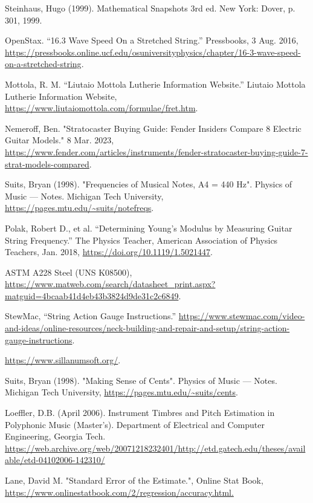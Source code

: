 \begin{thebibliography}{15}
    \scriptsize
     Steinhaus, Hugo (1999). Mathematical Snapshots 3rd ed. New York: Dover, p. 301, 1999.
    
     OpenStax. “16.3 Wave Speed On a Stretched String.” Pressbooks, 3 Aug. 2016, \url{https://pressbooks.online.ucf.edu/osuniversityphysics/chapter/16-3-wave-speed-on-a-stretched-string}.

     Mottola, R. M. “Liutaio Mottola Lutherie Information Website.” Liutaio Mottola Lutherie Information Website, \url{https://www.liutaiomottola.com/formulae/fret.htm}.

     Nemeroff, Ben. "Stratocaster Buying Guide: Fender Insiders Compare 8 Electric Guitar Models." 8 Mar. 2023, \url{https://www.fender.com/articles/instruments/fender-stratocaster-buying-guide-7-strat-models-compared}.

     Suits, Bryan (1998). "Frequencies of Musical Notes, A4 = 440 Hz". Physics of Music — Notes. Michigan Tech University, \url{https://pages.mtu.edu/~suits/notefreqs}.
    
     Polak, Robert D., et al. “Determining Young’s Modulus by Measuring Guitar String Frequency.” The Physics Teacher, American Association of Physics Teachers, Jan. 2018, \url{https://doi.org/10.1119/1.5021447}.

     ASTM A228 Steel (UNS K08500), \url{https://www.matweb.com/search/datasheet_print.aspx?matguid=4bcaab41d4eb43b3824d9de31c2c6849}.

     StewMac, “String Action Gauge Instructions.” \url{https://www.stewmac.com/video-and-ideas/online-resources/neck-building-and-repair-and-setup/string-action-gauge-instructions}.

     \url{https://www.sillanumsoft.org/}.

     Suits, Bryan (1998). "Making Sense of Cents". Physics of Music — Notes. Michigan Tech University, \url{https://pages.mtu.edu/~suits/cents}.

     Loeffler, D.B. (April 2006). Instrument Timbres and Pitch Estimation in Polyphonic Music (Master's). Department of Electrical and Computer Engineering, Georgia Tech. \url{https://web.archive.org/web/20071218232401/http://etd.gatech.edu/theses/available/etd-04102006-142310/}

     Lane, David M. "Standard Error of the Estimate.", Online Stat Book, \url{https://www.onlinestatbook.com/2/regression/accuracy.html.}

\end{thebibliography}